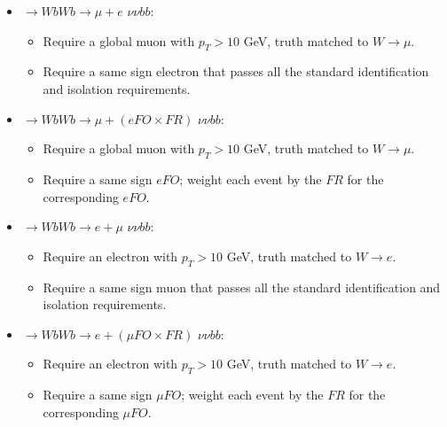 \begin{itemize}
\item \ttbar $\rightarrow Wb Wb \rightarrow \mu + e$  $ \nu \nu b b$:
\begin{itemize}
  \item Require a global muon with $p_T > 10$ GeV, truth matched to $W \rightarrow \mu$.
  \item Require a same sign electron that passes all the standard identification and isolation requirements. 
\end{itemize} 

\item \ttbar $\rightarrow Wb Wb \rightarrow \mu + (eFO \times FR)$  $ \nu \nu b b$:
\begin{itemize}
  \item Require a global muon with $p_T > 10$ GeV, truth matched to $W \rightarrow \mu$.
  \item Require a same sign $eFO$; weight each event by the $FR$ for the corresponding $eFO$.
\end{itemize} 

\item \ttbar $\rightarrow Wb Wb \rightarrow e + \mu  $  $ \nu \nu b b$:
\begin{itemize}
  \item Require an electron with $p_T > 10$ GeV, truth matched to $W \rightarrow e$.
  \item Require a same sign muon that passes all the standard identification and isolation requirements. 
\end{itemize} 

\item \ttbar $\rightarrow Wb Wb \rightarrow e + (\mu FO \times  FR)$  $ \nu \nu b b$:
\begin{itemize}
  \item Require an electron with $p_T > 10$ GeV, truth matched to $W \rightarrow e$.
  \item Require a same sign $\mu FO$; weight each event by the $FR$ for the corresponding $\mu FO$.
\end{itemize} 
\end{itemize} 

